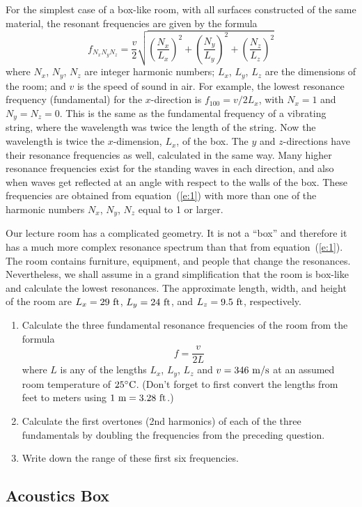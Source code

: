 \documentclass[11pt]{NSF}
\def\be{\begin{equation}}
\def\ee{\end{equation}}
\def\ben{\begin{enumerate}}
\def\een{\end{enumerate}}
\begin{document}
For the simplest case of a box-like room, with all surfaces constructed 
of the same material, the resonant frequencies are given by the formula
%
\be
f_{N_xN_yN_z} = \frac{v}{2}\sqrt{
\left(\frac{N_x}{L_x}\right)^2+
\left(\frac{N_y}{L_y}\right)^2+
\left(\frac{N_z}{L_z}\right)^2}
\label{e:1}
\ee
%
where $N_x$, $N_y$, $N_z$ are integer harmonic numbers; $L_x$, $L_y$,
$L_z$ are the dimensions of the room; and $v$ is the speed of sound in
air. For example, the lowest resonance frequency (fundamental) for the
$x$-direction is $f_{100} = v/2L_x$, with $N_x=1$ and $N_y=N_z=0$.
This is the same as the fundamental frequency of a vibrating
string, where the wavelength was twice the length of the string. Now
the wavelength is twice the $x$-dimension, $L_x$, of the box.  The $y$
and $z$-directions have their resonance frequencies as well,
calculated in the same way. Many higher resonance frequencies exist
for the standing waves in each direction, and also when waves get
reflected at an angle with respect to the walls of the box. These
frequencies are obtained from equation~(\ref{e:1}) with more than one of
the harmonic numbers $N_x$, $N_y$, $N_z$ equal to 1 or larger.

Our lecture room has a complicated geometry. It is not a ``box” 
and therefore it has a much more complex resonance spectrum than that from
equation~(\ref{e:1}). The room contains furniture, equipment, and people that
change the resonances. Nevertheless, we shall assume in a grand
simplification that the room is box-like and calculate the lowest
resonances.  
The approximate length, width, and height of the room are 
$L_x=29~{\rm ft}$, $L_y=24~{\rm ft}$, and $L_z=9.5~{\rm ft}$,
respectively.

\ben
\item
Calculate the three fundamental resonance frequencies of the room
from the formula
%
\be
f= \frac{v}{2L}
\ee
%
where $L$ is any of the lengths $L_x$, $L_y$, $L_z$ and $v = 346~{\rm
m/s}$ at an assumed room temperature of $25{}^\circ{\rm C}$.
(Don't forget to first convert the lengths from feet to meters using
$1~{\rm m}= 3.28~{\rm ft}$.)

\item 
Calculate the first overtones (2nd harmonics) of each of the three
fundamentals by doubling the frequencies from the preceding question.

\item
Write down the range of these first six frequencies.
\een

\subsection{Acoustics Box}
\end{document}
